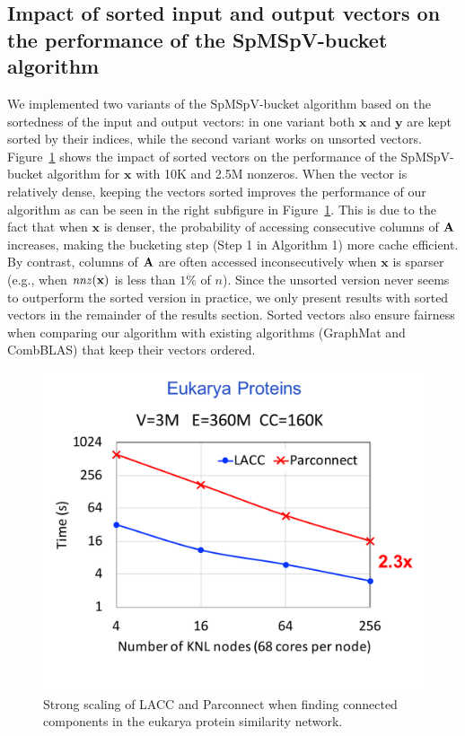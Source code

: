 \subsection{Impact of sorted input and output vectors on the performance of the SpMSpV-bucket algorithm}
We implemented two variants of the SpMSpV-bucket algorithm based on the sortedness of the input and output vectors: in one variant both $\mathbf{x}$ and $\mathbf{y}$ are kept sorted by their indices, while the second variant works on unsorted vectors.
Figure~\ref{fig:sorting} shows the impact of sorted vectors on the performance of the SpMSpV-bucket algorithm for $\mathbf{x}$ with 10K and 2.5M nonzeros.
When the vector is relatively dense, keeping the vectors sorted improves the performance of our algorithm as can be seen in the right subfigure in  Figure~\ref{fig:sorting}.
This is due to the fact that when $\mathbf{x}$ is denser, the probability of accessing consecutive columns of $\mathbf{A}$ increases, making the bucketing step (Step 1 in Algorithm 1) more cache efficient.
By contrast, columns of  $\mathbf{A}$ are often accessed inconsecutively when $\mathbf{x}$ is sparser (e.g., when $\dnnz(\mathbf{x})$ is less than $1\%$ of $n$).
Since the unsorted version never seems to outperform the sorted version in practice, we only present results with sorted vectors in the remainder of the results section.
Sorted vectors also ensure fairness when comparing our algorithm with existing algorithms (GraphMat and CombBLAS) that keep their vectors ordered. 


\begin{figure}[!t]
   \centering
   \includegraphics[scale=.5]{figures/eukarya} %
   \caption{Strong scaling of LACC and Parconnect when finding connected components in  the eukarya protein similarity network. }
   \label{fig:sorting}
\end{figure}

